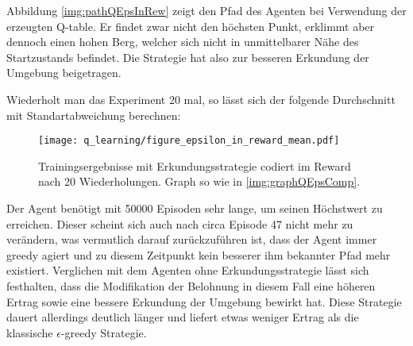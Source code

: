 Abbildung \ref{img:pathQEpsInRew} zeigt den Pfad des Agenten bei Verwendung der erzeugten Q-table. Er findet zwar nicht den höchsten Punkt, erklimmt aber dennoch einen hohen Berg, welcher sich nicht in unmittelbarer Nähe des Startzustands befindet. Die Strategie hat also zur besseren Erkundung der Umgebung beigetragen.

Wiederholt man das Experiment 20 mal, so lässt sich der folgende Durchschnitt mit Standartabweichung berechnen:
\begin{figure}[H]
    \centering
    \texttt{[image: q\_learning/figure\_epsilon\_in\_reward\_mean.pdf]}
    \caption{Trainingsergebnisse mit Erkundungsstrategie codiert im Reward nach 20 Wiederholungen. Graph so wie in \ref{img:graphQEpsComp}.} \label{img:graphQEpsInRewMean}
\end{figure}
Der Agent benötigt mit 50000 Episoden sehr lange, um seinen Höchstwert zu erreichen. Dieser scheint sich auch nach circa Episode 47 nicht mehr zu verändern, was vermutlich darauf zurückzuführen ist, dass der Agent immer greedy agiert und zu diesem Zeitpunkt kein besserer ihm bekannter Pfad mehr existiert. Verglichen mit dem Agenten ohne Erkundungsstrategie lässt sich festhalten, dass die Modifikation der Belohnung in diesem Fall eine höheren Ertrag sowie eine bessere Erkundung der Umgebung bewirkt hat. Diese Strategie dauert allerdings deutlich länger und liefert etwas weniger Ertrag als die klassische $ \epsilon $-greedy Strategie.






